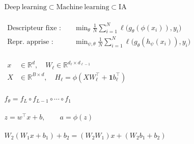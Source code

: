 \documentclass[border=4pt,multi=preview]{standalone}
\begin{document}
\begin{preview}\color{ink}\fontsize{24}{30}\selectfont
$\displaystyle \begin{gathered}\mathrm{Deep\ learning}\subset\mathrm{Machine\ learning}\subset\mathrm{IA}\end{gathered}$
\end{preview}
\begin{preview}\color{ink}\fontsize{24}{30}\selectfont
$\displaystyle \begin{gathered}\begin{aligned}\text{Descripteur fixe :}\quad &\min_{\theta}\frac{1}{N}\sum_{i=1}^{N}\ell\bigl(g_{\theta}(\phi(x_i)),y_i\bigr)\\[8pt]\text{Repr. apprise :}\quad &\min_{\psi,\theta}\frac{1}{N}\sum_{i=1}^{N}\ell\bigl(g_{\theta}(h_{\psi}(x_i)),y_i\bigr)\end{aligned}\end{gathered}$
\end{preview}
\begin{preview}\color{ink}\fontsize{24}{30}\selectfont
$\displaystyle \begin{gathered}\begin{aligned}x&\in\mathbb{R}^{d},\quad W_\ell\in\mathbb{R}^{d_\ell\times d_{\ell-1}}\\X&\in\mathbb{R}^{B\times d},\quad H_\ell=\phi(XW_\ell^\top+\mathbf{1}b_\ell^\top)\end{aligned}\end{gathered}$
\end{preview}
\begin{preview}\color{ink}\fontsize{24}{30}\selectfont
$\displaystyle \begin{gathered}f_\theta=f_L\circ f_{L-1}\circ\cdots\circ f_1\end{gathered}$
\end{preview}
\begin{preview}\color{ink}\fontsize{24}{30}\selectfont
$\displaystyle \begin{gathered}z=w^\top x+b,\qquad a=\phi(z)\end{gathered}$
\end{preview}
\begin{preview}\color{ink}\fontsize{24}{30}\selectfont
$\displaystyle \begin{gathered}W_2(W_1x+b_1)+b_2=(W_2W_1)x+(W_2b_1+b_2)\end{gathered}$
\end{preview}
\end{document}
